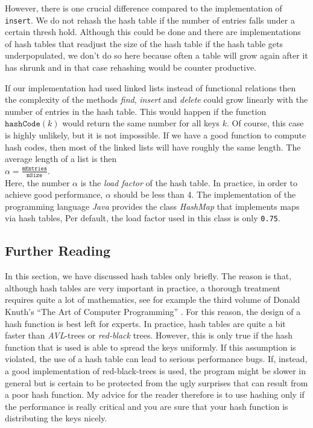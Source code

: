 However, there is one crucial difference compared to the implementation of \texttt{insert}.
We do not rehash the hash table if the number of entries falls under a certain thresh hold.
Although this could be done and there are implementations of hash tables that readjust the size of the
hash table if the hash table gets underpopulated, we don't do so here because often a table will
grow again after it has shrunk and in that case rehashing would be counter productive.

If our implementation had used linked lists instead of functional relations then the complexity of
the methods  \textsl{find}, \textsl{insert} and \textsl{delete} could grow linearly with the number
of entries in the hash table.  This would happen if the function 
$\texttt{hashCode}(k)$ would return the same number for all keys $k$.  Of course, this case is
highly unlikely, but it is not impossible.  If we have a good function to compute hash codes, then
most of the linked lists will have roughly the same length.  The average length of a list is then
 \\[0.2cm]
\hspace*{1.3cm}
 $\alpha = \displaystyle \frac{\mathtt{mEntries}}{\mathtt{mSize}}$. 
\\[0.2cm]
Here, the number $\alpha$ is the \emph{load factor} of the hash table.  In practice, in order to
achieve good performance, $\alpha$ should be less than 4.  The implementation of the programming
language \textsl{Java} provides the class  \textsl{HashMap} that implements maps via hash tables,
Per default, the load factor used in this class is only \texttt{0.75}.


\subsection{Further Reading}
In this section, we have discussed hash tables only briefly.  The reason is that, although hash tables are very
important in practice, a thorough treatment requires quite a lot of mathematics, see for example the
third volume of Donald Knuth's ``The Art of Computer Programming'' \cite{knuth:1998b}.  For this
reason, the design of a hash function is best left for experts.  In practice, hash tables are
quite a bit faster than \textsl{AVL}-trees or \emph{red-black} trees.  However, this is only true if
the hash function that is used is able to spread the keys uniformly.  If this assumption is
violated, the use of a hash table can lead to serious performance 
bugs.  If, instead, a good
implementation of red-black-trees is used, the program might be slower in general but is certain to
be protected from the ugly surprises that can result from a poor hash function.  My advice for the reader
therefore is to use hashing only if the performance is really critical and you are sure that your
hash function is distributing the keys nicely.


